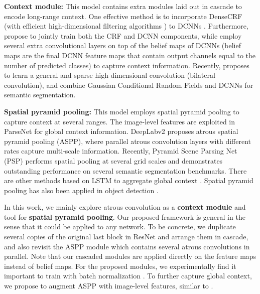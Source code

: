 \textbf{Context module:} This model contains extra modules laid out in cascade to encode long-range context. One effective method is to incorporate DenseCRF \cite{krahenbuhl2011efficient} (with efficient high-dimensional filtering algorithms \cite{adams2010fast}) to DCNNs \cite{chen2014semantic, chen2016deeplab}. Furthermore, \cite{zheng2015conditional, lin2015efficient, schwing2015fully} propose to jointly train both the CRF and DCNN components, while \cite{liu2015semantic, yu2015multi} employ several extra convolutional layers on top of the belief maps of DCNNs (belief maps are the final DCNN feature maps that contain output channels equal to the number of predicted classes) to capture context information. Recently, \cite{jampani2016learning} proposes to learn a general and sparse high-dimensional convolution (bilateral convolution), and \cite{Vemulapalli2016Gaussian, chandra2016fast} combine Gaussian Conditional Random Fields and DCNNs for semantic segmentation.

\textbf{Spatial pyramid pooling:} This model employs spatial pyramid pooling \cite{grauman2005pyramid, lazebnik2006beyond} to capture context at several ranges. The image-level features are exploited in ParseNet \cite{liu2015parsenet} for global context information. DeepLabv2 \cite{chen2016deeplab} proposes atrous spatial pyramid pooling (ASPP), where parallel atrous convolution layers with different rates capture multi-scale information. Recently, Pyramid Scene Parsing Net (PSP) \cite{zhao2016pyramid} performs spatial pooling at several grid scales and demonstrates outstanding performance on several semantic segmentation benchmarks. There are other methods based on LSTM \cite{hochreiter1997long} to aggregate global context \cite{liang2015semantic, byeon2015scene, yan2016combining}. Spatial pyramid pooling has also been applied in object detection \cite{he2014spatial}.

In this work, we mainly explore atrous convolution \cite{holschneider1989real, giusti2013fast, sermanet2013overfeat, papandreou2014untangling, chen2014semantic, yu2015multi, chen2016deeplab} as a {\bf{context module}} and tool for {\bf{spatial pyramid pooling}}. Our proposed framework is general in the sense that it could be applied to any network. To be concrete, we duplicate several copies of the original last block in ResNet \cite{he2015deep} and arrange them in cascade, and also revisit the ASPP module \cite{chen2016deeplab} which contains several atrous convolutions in parallel. Note that our cascaded modules are applied directly on the feature maps instead of belief maps. For the proposed modules, we experimentally find it important to train with batch normalization \cite{ioffe2015batch}. To further capture global context, we propose to augment ASPP with image-level features, similar to \cite{liu2015parsenet, zhao2016pyramid}.

